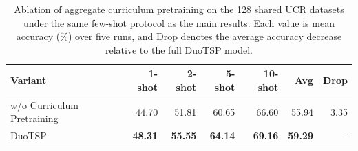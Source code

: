 \begin{table}[t]
\centering
\caption{Ablation of aggregate curriculum pretraining on the 128 shared UCR datasets under the same few-shot protocol as the main results. Each value is mean accuracy (\%) over five runs, and Drop denotes the average accuracy decrease relative to the full DuoTSP model.}
\label{tab:ablation-pretrain}
\begin{tabular}{lrrrrrr}
\toprule
Variant & 1-shot & 2-shot & 5-shot & 10-shot & Avg & Drop \\
\midrule
w/o Curriculum Pretraining & 44.70 & 51.81 & 60.65 & 66.60 & 55.94 & 3.35 \\
DuoTSP & \textbf{48.31} & \textbf{55.55} & \textbf{64.14} & \textbf{69.16} & \textbf{59.29} & -- \\
\bottomrule
\end{tabular}
\end{table}
